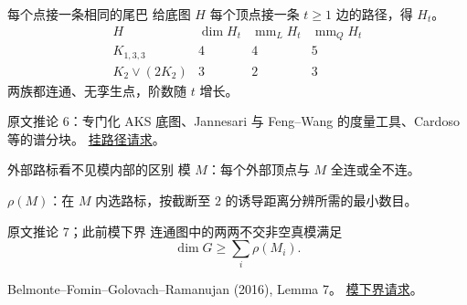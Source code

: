 \documentclass{beamer}
\begin{document}
\begin{frame}{每个点接一条相同的尾巴}
给底图 $H$ 每个顶点接一条 $t\geq1$ 边的路径，得 $H_t$。
\[
\begin{array}{c|ccc}
H&\dim H_t&\operatorname{mm}_L H_t&\operatorname{mm}_Q H_t\\\hline
K_{1,3,3}&4&4&5\\
K_2\vee(2K_2)&3&2&3
\end{array}
\]
两族都连通、无孪生点，阶数随 $t$ 增长。

\small 原文推论 6：专门化 AKS 底图、Jannesari 与 Feng--Wang 的度量工具、Cardoso 等的谱分块。
\href{https://github.com/the-omega-institute/trureturing-requests/issues/42}{挂路径请求}。
\end{frame}
\begin{frame}{外部路标看不见模内部的区别}
模 $M$：每个外部顶点与 $M$ 全连或全不连。

$\rho(M)$：在 $M$ 内选路标，按截断至 $2$ 的诱导距离分辨所需的最小数目。
\begin{block}{原文推论 7；此前模下界}
连通图中的两两不交非空真模满足
\[
\dim G\geq\sum_i\rho(M_i).
\]
\end{block}
\small Belmonte--Fomin--Golovach--Ramanujan (2016), Lemma 7。
\href{https://github.com/the-omega-institute/trureturing-requests/issues/43}{模下界请求}。
\end{frame}
\end{document}
